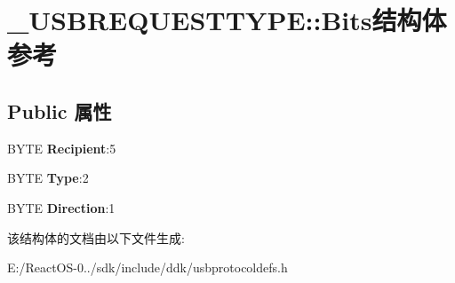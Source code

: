 \hypertarget{struct___u_s_b_r_e_q_u_e_s_t_t_y_p_e_1_1_bits}{}\section{\+\_\+\+U\+S\+B\+R\+E\+Q\+U\+E\+S\+T\+T\+Y\+PE\+:\+:Bits结构体 参考}
\label{struct___u_s_b_r_e_q_u_e_s_t_t_y_p_e_1_1_bits}
\subsection*{Public 属性}
\begin{DoxyCompactItemize}
\item 
\mbox{\label{struct___u_s_b_r_e_q_u_e_s_t_t_y_p_e_1_1_bits_a0f3cf7583afb6ca8f01e8f6b0600f4e3}} 
B\+Y\+TE {\bfseries Recipient}\+:5
\item 
\mbox{\label{struct___u_s_b_r_e_q_u_e_s_t_t_y_p_e_1_1_bits_a765f991af4f976f62b839804ae27b114}} 
B\+Y\+TE {\bfseries Type}\+:2
\item 
\mbox{\label{struct___u_s_b_r_e_q_u_e_s_t_t_y_p_e_1_1_bits_a71ec52a4bc4d4f4d87f1cf3dadecd2b7}} 
B\+Y\+TE {\bfseries Direction}\+:1
\end{DoxyCompactItemize}


该结构体的文档由以下文件生成\+:\begin{DoxyCompactItemize}
\item 
E\+:/\+React\+O\+S-\/0../sdk/include/ddk/usbprotocoldefs.\+h\end{DoxyCompactItemize}
